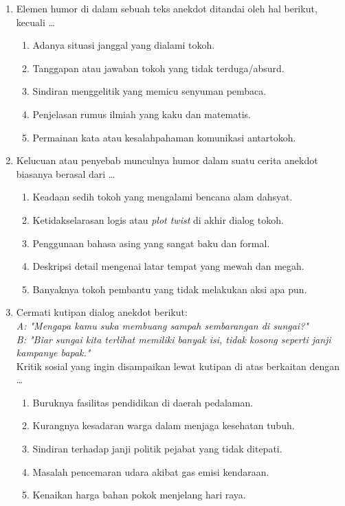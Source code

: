\documentclass[12pt,a4paper]{article}
\begin{document}
\begin{enumerate}[leftmargin=*]
\item Elemen humor di dalam sebuah teks anekdot ditandai oleh hal berikut, kecuali \dots
    \begin{enumerate}[label=\alph*.]
        \item Adanya situasi janggal yang dialami tokoh.
        \item Tanggapan atau jawaban tokoh yang tidak terduga/absurd.
        \item Sindiran menggelitik yang memicu senyuman pembaca.
        \item Penjelasan rumus ilmiah yang kaku dan matematis.
        \item Permainan kata atau kesalahpahaman komunikasi antartokoh.
    \end{enumerate}

\item Kelucuan atau penyebab munculnya humor dalam suatu cerita anekdot biasanya berasal dari \dots
    \begin{enumerate}[label=\alph*.]
        \item Keadaan sedih tokoh yang mengalami bencana alam dahsyat.
        \item Ketidakselarasan logis atau \textit{plot twist} di akhir dialog tokoh.
        \item Penggunaan bahasa asing yang sangat baku dan formal.
        \item Deskripsi detail mengenai latar tempat yang mewah dan megah.
        \item Banyaknya tokoh pembantu yang tidak melakukan aksi apa pun.
    \end{enumerate}

\item Cermati kutipan dialog anekdot berikut:\\
\textit{A: "Mengapa kamu suka membuang sampah sembarangan di sungai?"}\\
\textit{B: "Biar sungai kita terlihat memiliki banyak isi, tidak kosong seperti janji kampanye bapak."}\\
Kritik sosial yang ingin disampaikan lewat kutipan di atas berkaitan dengan \dots
    \begin{enumerate}[label=\alph*.]
        \item Buruknya fasilitas pendidikan di daerah pedalaman.
        \item Kurangnya kesadaran warga dalam menjaga kesehatan tubuh.
        \item Sindiran terhadap janji politik pejabat yang tidak ditepati.
        \item Masalah pencemaran udara akibat gas emisi kendaraan.
        \item Kenaikan harga bahan pokok menjelang hari raya.
    \end{enumerate}


\end{enumerate}
\end{document}
